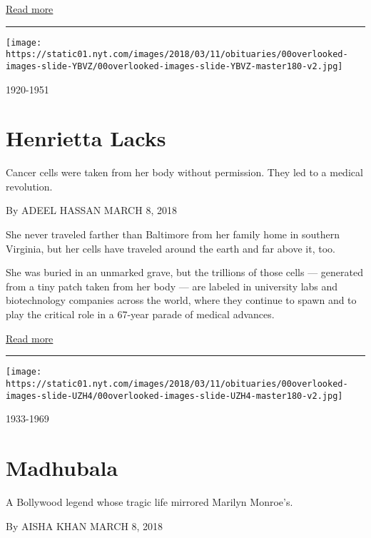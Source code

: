 \href{https://www.nytimes.com/interactive/2018/obituaries/overlooked-sylvia-plath.html}{Read
more}

\begin{center}\rule{0.5\linewidth}{\linethickness}\end{center}

\texttt{[image: https://static01.nyt.com/images/2018/03/11/obituaries/00overlooked-images-slide-YBVZ/00overlooked-images-slide-YBVZ-master180-v2.jpg]}

1920-1951

\hypertarget{henrietta-lacks}{%
\section{Henrietta Lacks}\label{henrietta-lacks}}

Cancer cells were taken from her body without permission. They led to a
medical revolution.

By ADEEL HASSAN MARCH 8, 2018

She never traveled farther than Baltimore from her family home in
southern Virginia, but her cells have traveled around the earth and far
above it, too.

She was buried in an unmarked grave, but the trillions of those cells
--- generated from a tiny patch taken from her body --- are labeled in
university labs and biotechnology companies across the world, where they
continue to spawn and to play the critical role in a 67-year parade of
medical advances.

\href{https://www.nytimes.com/interactive/2018/obituaries/overlooked-henrietta-lacks.html}{Read
more}

\begin{center}\rule{0.5\linewidth}{\linethickness}\end{center}

\texttt{[image: https://static01.nyt.com/images/2018/03/11/obituaries/00overlooked-images-slide-UZH4/00overlooked-images-slide-UZH4-master180-v2.jpg]}

1933-1969

\hypertarget{madhubala}{%
\section{Madhubala}\label{madhubala}}

A Bollywood legend whose tragic life mirrored Marilyn Monroe's.

By AISHA KHAN MARCH 8, 2018

